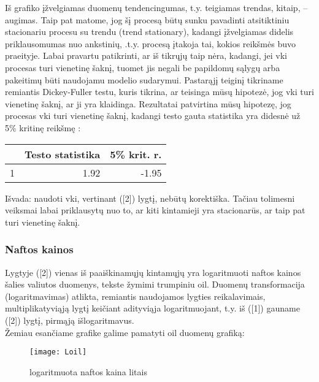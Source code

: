 \documentclass[a4paper]{article}
\begin{document}
\noindent Iš grafiko įžvelgiamas duomenų tendencingumas, t.y. teigiamas trendas, kitaip, – augimas. Taip pat matome, jog šį procesą būtų sunku pavadinti atsitiktiniu stacionariu procesu su trendu (trend stationary), kadangi įžvelgiamas didelis priklausomumas nuo ankstinių, .t.y. procesą įtakoja tai, kokios reikšmės buvo praeityje. Labai pravartu patikrinti, ar iš tikrųjų taip nėra, kadangi,  jei vki procesas turi vienetinę šaknį, tuomet jis negali be papildomų sąlygų arba pakeitimų būti naudojamu modelio sudarymui. Pastarąjį teiginį tikriname remiantis Dickey-Fuller testu, kuris tikrina, ar teisinga mūsų hipotezė, jog vki turi vienetinę šaknį, ar ji yra klaidinga. Rezultatai patvirtina mūsų hipotezę, jog procesas vki turi vienetinę šaknį, kadangi testo gauta statistika yra didesnė už 5\% kritinę reikšmę :

\begin{table}[!h]
\begin{center}
\begin{tabular}{rrr}
  \hline
 & Testo statistika & 5\% krit. r. \\ 
  \hline
1 & 1.92 & -1.95 \\ 
   \hline
\end{tabular}
\end{center}
\end{table}

\noindent Išvada:  naudoti vki, vertinant ([2]) lygtį, nebūtų korektiška. Tačiau tolimesni veiksmai labai priklausytų nuo to, ar kiti kintamieji yra stacionarūs, ar taip pat turi vienetinę šaknį.

\newpage \subsubsection{Naftos kainos} 
		
Lygtyje ([2]) vienas iš paaiškinamųjų kintamųjų yra logaritmuoti naftos kainos šalies valiutos duomenys, tekste žymimi trumpiniu oil. Duomenų transformacija (logaritmavimas) atlikta, remiantis naudojamos lygties reikalavimais, multiplikatyviąją lygtį keičiant adityviąja logaritmuojant, t.y. iš ([1]) gauname ([2]) lygtį, pirmąją išlogaritmavus.\\ Žemiau esančiame grafike galime pamatyti oil duomenų grafiką:

\begin{figure}[!h]
\centering
\texttt{[image: Loil]}
\caption{logaritmuota naftos kaina litais}
\end{figure}
\end{document}
